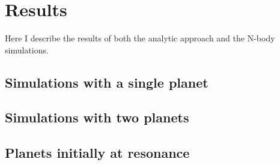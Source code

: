 \chapter{Results}
\label{ch:results}
Here I describe the results of both the analytic approach and 
the N-body simulations.

\section{Simulations with a single planet}
\label{sec:Simulations with a single planet}

\section{Simulations with two planets}
\label{sec:Simulations with two planets}

\section{Planets initially at resonance}
\label{sec:Planets initially at resonance}


